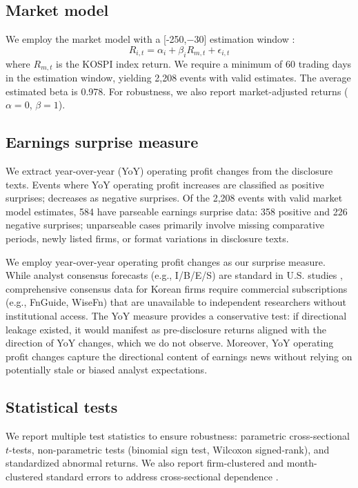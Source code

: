 \documentclass[review,authoryear]{elsarticle}
\begin{document}
\subsection{Market model}

We employ the market model with a [-250,$-$30] estimation window \citep{mackinlay1997event}:
\begin{equation}
R_{i,t} = \alpha_i + \beta_i R_{m,t} + \epsilon_{i,t}
\end{equation}
where $R_{m,t}$ is the KOSPI index return. We require a minimum of 60 trading days in the estimation window, yielding 2,208 events with valid estimates. The average estimated beta is 0.978. For robustness, we also report market-adjusted returns ($\alpha=0$, $\beta=1$).

\subsection{Earnings surprise measure}

We extract year-over-year (YoY) operating profit changes from the disclosure texts. Events where YoY operating profit increases are classified as positive surprises; decreases as negative surprises. Of the 2,208 events with valid market model estimates, 584 have parseable earnings surprise data: 358 positive and 226 negative surprises; unparseable cases primarily involve missing comparative periods, newly listed firms, or format variations in disclosure texts.

We employ year-over-year operating profit changes as our surprise measure. While analyst consensus forecasts (e.g., I/B/E/S) are standard in U.S. studies \citep{livnat2006comparing}, comprehensive consensus data for Korean firms require commercial subscriptions (e.g., FnGuide, WiseFn) that are unavailable to independent researchers without institutional access. The YoY measure provides a conservative test: if directional leakage existed, it would manifest as pre-disclosure returns aligned with the direction of YoY changes, which we do not observe. Moreover, YoY operating profit changes capture the directional content of earnings news without relying on potentially stale or biased analyst expectations.

\subsection{Statistical tests}

We report multiple test statistics to ensure robustness: parametric cross-sectional $t$-tests, non-parametric tests (binomial sign test, Wilcoxon signed-rank), and standardized abnormal returns. We also report firm-clustered and month-clustered standard errors to address cross-sectional dependence \citep{kolari2010event}.
\end{document}
